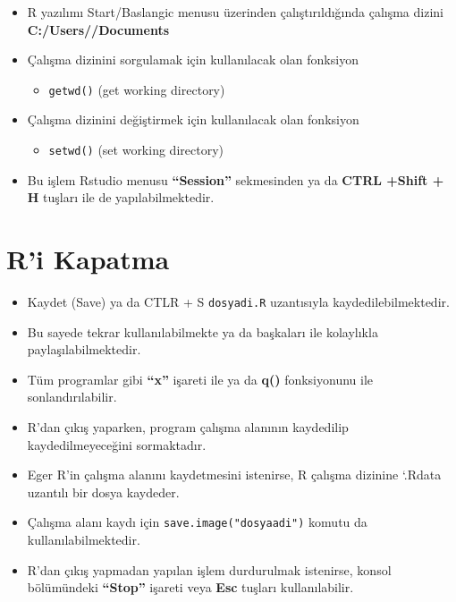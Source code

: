 \documentclass[
  oneside]{book}
\providecommand{\tightlist}{%
  \setlength{\itemsep}{0pt}\setlength{\parskip}{0pt}}
\begin{document}
\begin{itemize}
\item
  R yazılımı Start/Baslangic menusu üzerinden çalıştırıldığında çalışma dizini \textbf{C:/Users//Documents}
\item
  Çalışma dizinini sorgulamak için kullanılacak olan fonksiyon

  \begin{itemize}
  \tightlist
  \item
    \texttt{getwd()} (get working directory)
  \end{itemize}
\item
  Çalışma dizinini değiştirmek için kullanılacak olan fonksiyon

  \begin{itemize}
  \tightlist
  \item
    \texttt{setwd()} (set working directory)
  \end{itemize}
\item
  Bu işlem Rstudio menusu \textbf{``Session''} sekmesinden ya da \textbf{CTRL +Shift + H} tuşları ile de yapılabilmektedir.
\end{itemize}

\hypertarget{ri-kapatma}{%
\section{R'i Kapatma}\label{ri-kapatma}}

\begin{itemize}
\item
  Kaydet (Save) ya da CTLR + S \texttt{dosyadi.R} uzantısıyla kaydedilebilmektedir.
\item
  Bu sayede tekrar kullanılabilmekte ya da başkaları ile kolaylıkla paylaşılabilmektedir.
\item
  Tüm programlar gibi \textbf{``x''} işareti ile ya da \textbf{q()} fonksiyonunu ile sonlandırılabilir.
\item
  R'dan çıkış yaparken, program çalışma alanının kaydedilip kaydedilmeyeceğini sormaktadır.
\item
  Eger R'in çalışma alanını kaydetmesini istenirse, R çalışma dizinine `.Rdata uzantılı bir dosya kaydeder.
\item
  Çalışma alanı kaydı için \texttt{save.image("dosyaadi")} komutu da kullanılabilmektedir.
\item
  R'dan çıkış yapmadan yapılan işlem durdurulmak istenirse, konsol bölümündeki \textbf{``Stop''} işareti veya \textbf{Esc} tuşları kullanılabilir.
\end{itemize}
\end{document}
